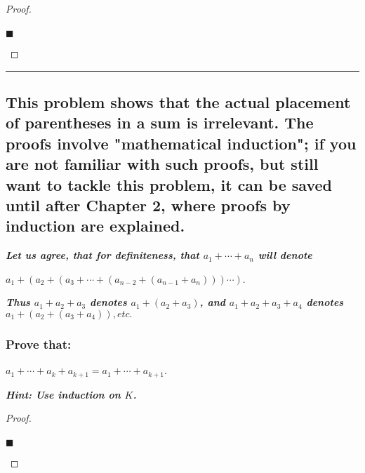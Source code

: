 \documentclass[letterpaper, 10 pt, conference]{ieeeconf}  %
\begin{document}
\begin{proof}
\begin{align}
    
\end{align}
\begin{flushright}
$\blacksquare$
\end{flushright}
\end{proof}
\noindent\rule{8cm}{0.4pt}
\newpage
\begin{mdframed}

\subsection{\textbf{This problem shows that the actual placement of parentheses in a sum is irrelevant. The proofs involve "mathematical induction"; if you are not familiar with such proofs, but still want to tackle this problem, it can be saved
until after Chapter 2, where proofs by induction are explained.}}

\textbf{\textit{Let us agree, that for definiteness, that $a_1 + \cdots + a_n$ will denote}}

\begin{center}
    $a_1 + (a_2 + (a_3 + \cdots  + (a_{n-2} + (a_{n-1} + a_n))) \cdots )$.
\end{center}

\textbf{\textit{Thus $a_1 + a_2 + a_3$ denotes $a_1 + (a_2 + a_3)$, and $a_1 + a_2 + a_3 + a_4$ denotes $a_1 + (a_2 + (a_3 + a_4)), etc.$}}
\end{mdframed}

\begin{mdframed}
\subsubsection{\textbf{Prove that:}}

\begin{center}
    $a_1 + \cdots + a_k + a_{k+1} = a_1 + \cdots + a_{k+1}$. 
\end{center}

\textbf{\textit{Hint: Use induction on $K$.}}
\end{mdframed}

\begin{proof}
\begin{align}
    
\end{align}
\begin{flushright}
$\blacksquare$
\end{flushright}
\end{proof}
\end{document}
